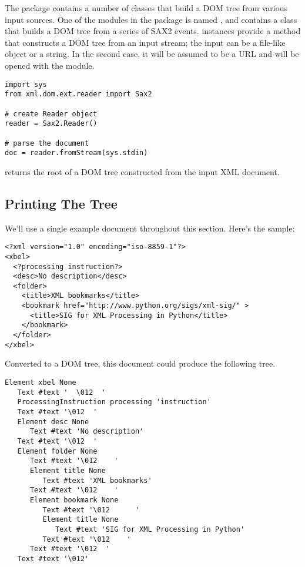 \documentclass{howto}
\begin{document}
The  package contains a number of classes
that build a DOM tree from various input sources.  One of the modules
in the  package is named , and contains a
 class that builds a DOM tree from a series of SAX2
events.   instances provide a 
method that constructs a DOM tree from an input stream; the input can
be a file-like object or a string.  In the second case, it will be
assumed to be a URL and will be opened with the 
module.

\begin{verbatim}
import sys
from xml.dom.ext.reader import Sax2

# create Reader object
reader = Sax2.Reader()

# parse the document
doc = reader.fromStream(sys.stdin)
\end{verbatim}

 returns the root of a DOM tree constructed from
the input XML document.


\subsection{Printing The Tree}

We'll use a single example document throughout this section.  Here's
the sample:

\begin{verbatim}
<?xml version="1.0" encoding="iso-8859-1"?>
<xbel>  
  <?processing instruction?>
  <desc>No description</desc>
  <folder>
    <title>XML bookmarks</title>
    <bookmark href="http://www.python.org/sigs/xml-sig/" >
      <title>SIG for XML Processing in Python</title>
    </bookmark>
  </folder>
</xbel>
\end{verbatim}

Converted to a DOM tree, this document could produce the following
tree.   

\begin{verbatim}
Element xbel None
   Text #text '  \012  '
   ProcessingInstruction processing 'instruction'
   Text #text '\012  '
   Element desc None
      Text #text 'No description'
   Text #text '\012  '
   Element folder None
      Text #text '\012    '
      Element title None
         Text #text 'XML bookmarks'
      Text #text '\012    '
      Element bookmark None
         Text #text '\012      '
         Element title None
            Text #text 'SIG for XML Processing in Python'
         Text #text '\012    '
      Text #text '\012  '
   Text #text '\012'
\end{verbatim}
\end{document}
